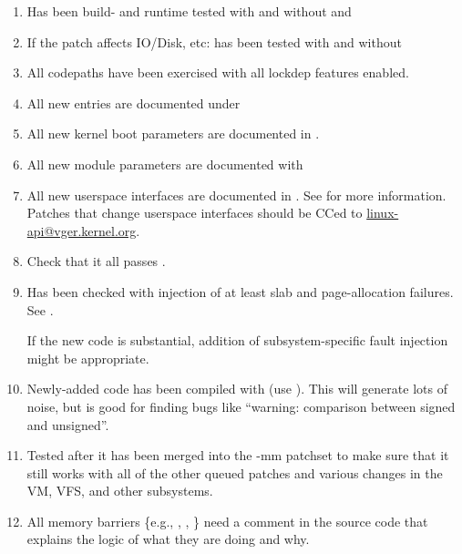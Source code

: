 \documentclass[a4paper,8pt,english]{sphinxmanual}
\begin{document}
\begin{enumerate}
\item {} 
Has been build- and runtime tested with and without  and

\item {} 
If the patch affects IO/Disk, etc: has been tested with and without

\item {} 
All codepaths have been exercised with all lockdep features enabled.

\item {} 
All new  entries are documented under 

\item {} 
All new kernel boot parameters are documented in
.

\item {} 
All new module parameters are documented with 

\item {} 
All new userspace interfaces are documented in .
See  for more information.
Patches that change userspace interfaces should be CCed to
\href{mailto:linux-api@vger.kernel.org}{linux-api@vger.kernel.org}.

\item {} 
Check that it all passes .

\item {} 
Has been checked with injection of at least slab and page-allocation
failures.  See .

If the new code is substantial, addition of subsystem-specific fault
injection might be appropriate.

\item {} 
Newly-added code has been compiled with  (use
).  This will generate lots of noise, but is good
for finding bugs like ``warning: comparison between signed and unsigned''.

\item {} 
Tested after it has been merged into the -mm patchset to make sure
that it still works with all of the other queued patches and various
changes in the VM, VFS, and other subsystems.

\item {} 
All memory barriers \{e.g., , , \} need a
comment in the source code that explains the logic of what they are doing
and why.


\end{enumerate}
\end{document}
